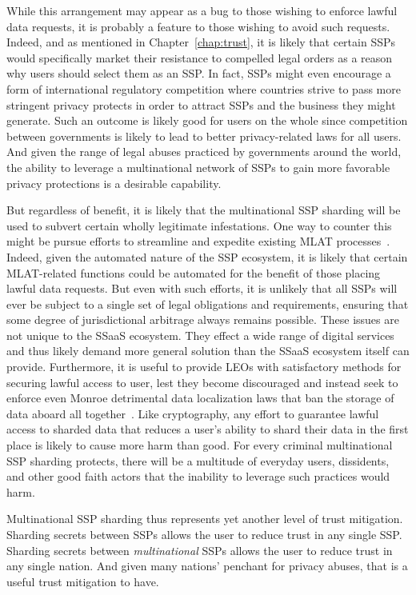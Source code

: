 While this arrangement may appear as a bug to those wishing to enforce
lawful data requests, it is probably a feature to those wishing to
avoid such requests. Indeed, and as mentioned in
Chapter~\ref{chap:trust}, it is likely that certain SSPs would
specifically market their resistance to compelled legal orders as a
reason why users should select them as an SSP. In fact, SSPs might
even encourage a form of international regulatory competition where
countries strive to pass more stringent privacy protects in order to
attract SSPs and the business they might generate. Such an outcome is
likely good for users on the whole since competition between
governments is likely to lead to better privacy-related laws for all
users. And given the range of legal abuses practiced by governments
around the world, the ability to leverage a multinational network of
SSPs to gain more favorable privacy protections is a desirable
capability.

But regardless of benefit, it is likely that the multinational SSP
sharding will be used to subvert certain wholly legitimate
infestations. One way to counter this might be pursue efforts to
streamline and expedite existing MLAT
processes~\cite{nojeim2015}. Indeed, given the automated nature of the
SSP ecosystem, it is likely that certain MLAT-related functions could
be automated for the benefit of those placing lawful data
requests. But even with such efforts, it is unlikely that all SSPs
will ever be subject to a single set of legal obligations and
requirements, ensuring that some degree of jurisdictional arbitrage
always remains possible. These issues are not unique to the SSaaS
ecosystem. They effect a wide range of digital services and thus
likely demand more general solution than the SSaaS ecosystem itself
can provide. Furthermore, it is useful to provide LEOs with
satisfactory methods for securing lawful access to user, lest they
become discouraged and instead seek to enforce even Monroe detrimental
data localization laws that ban the storage of data aboard all
together~\cite{whitehouse2013}. Like cryptography, any effort to
guarantee lawful access to sharded data that reduces a user's ability
to shard their data in the first place is likely to cause more harm
than good. For every criminal multinational SSP sharding protects,
there will be a multitude of everyday users, dissidents, and other
good faith actors that the inability to leverage such practices would
harm.

Multinational SSP sharding thus represents yet another level of trust
mitigation. Sharding secrets between SSPs allows the user to reduce
trust in any single SSP. Sharding secrets between \emph{multinational}
SSPs allows the user to reduce trust in any single nation. And given
many nations' penchant for privacy abuses, that is a useful trust
mitigation to have.

